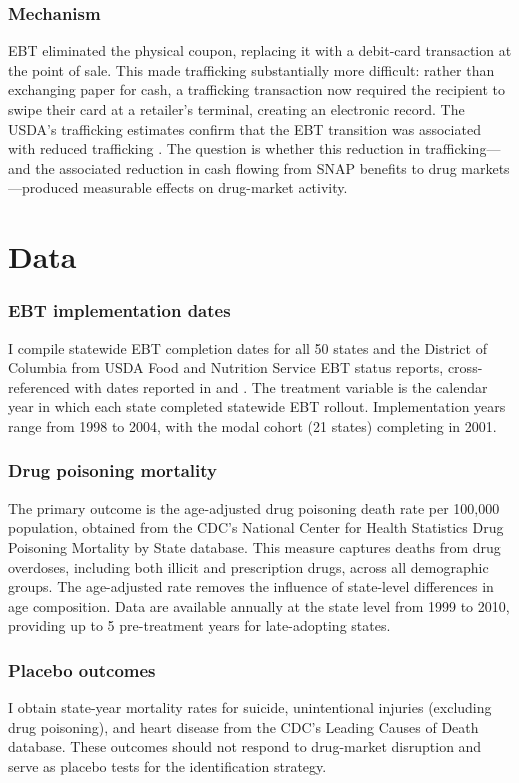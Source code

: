 \documentclass[12pt]{article}
\begin{document}
\subsubsection*{Mechanism} EBT eliminated the physical coupon, replacing it with a debit-card transaction at the point of sale. This made trafficking substantially more difficult: rather than exchanging paper for cash, a trafficking transaction now required the recipient to swipe their card at a retailer's terminal, creating an electronic record. The USDA's trafficking estimates confirm that the EBT transition was associated with reduced trafficking \citep{usda2013extent}. The question is whether this reduction in trafficking---and the associated reduction in cash flowing from SNAP benefits to drug markets---produced measurable effects on drug-market activity.

\section{Data}
\label{sec:data}

\subsubsection*{EBT implementation dates} I compile statewide EBT completion dates for all 50 states and the District of Columbia from USDA Food and Nutrition Service EBT status reports, cross-referenced with dates reported in \citet{currie2008transfers} and \citet{whitmore2002food}. The treatment variable is the calendar year in which each state completed statewide EBT rollout. Implementation years range from 1998 to 2004, with the modal cohort (21 states) completing in 2001.

\subsubsection*{Drug poisoning mortality} The primary outcome is the age-adjusted drug poisoning death rate per 100,000 population, obtained from the CDC's National Center for Health Statistics Drug Poisoning Mortality by State database. This measure captures deaths from drug overdoses, including both illicit and prescription drugs, across all demographic groups. The age-adjusted rate removes the influence of state-level differences in age composition. Data are available annually at the state level from 1999 to 2010, providing up to 5 pre-treatment years for late-adopting states.

\subsubsection*{Placebo outcomes} I obtain state-year mortality rates for suicide, unintentional injuries (excluding drug poisoning), and heart disease from the CDC's Leading Causes of Death database. These outcomes should not respond to drug-market disruption and serve as placebo tests for the identification strategy.
\end{document}
